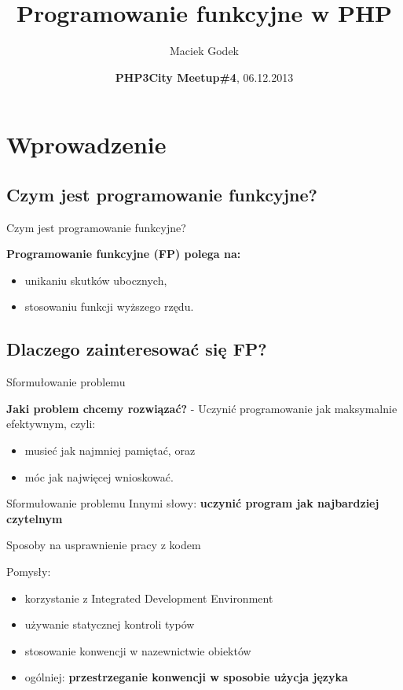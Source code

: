 \documentclass{beamer}
\title{\textbf{Programowanie funkcyjne w PHP}}
\author{Maciek Godek}
\institute{\{ \textbf{fido} : \emph{labs} \}\newline \newline
\tiny{\href{mailto:godek.maciek@gmail.com}{\textbf{godek.maciek@gmail.com}}}}
\date{\textbf{PHP3City Meetup\#4}, 06.12.2013}
\begin{document}
\begin{frame}
  \titlepage
\end{frame}

\section{Wprowadzenie}

\subsection{Czym jest programowanie funkcyjne?}

\begin{frame}{Czym jest programowanie funkcyjne?}

  \textbf{Programowanie funkcyjne (FP) polega na:}
  \pause
  \begin{itemize}
  \item
    unikaniu skutków ubocznych,
    \pause
  \item
    stosowaniu funkcji wyższego rzędu.
  \end{itemize}
\end{frame}

\subsection{Dlaczego zainteresować się FP?}

\begin{frame}{Sformułowanie problemu}

  \textbf{Jaki problem chcemy rozwiązać?}\pause \newline
  - Uczynić programowanie jak maksymalnie efektywnym, \pause czyli:
  \begin{itemize}
    \item
      musieć jak najmniej pamiętać, \pause oraz
    \item
      móc jak najwięcej wnioskować.
  \end{itemize}
\end{frame}

\begin{frame}{Sformułowanie problemu}
  Innymi słowy: \pause \textbf{uczynić program jak najbardziej czytelnym}
\end{frame}

\begin{frame}{Sposoby na usprawnienie pracy z kodem}
  
  Pomysły:\pause
  \begin{itemize}
    \item
      korzystanie z Integrated Development Environment\pause
    \item
      używanie statycznej kontroli typów\pause
    \item
      stosowanie konwencji w nazewnictwie obiektów\pause
    \item
      ogólniej: \textbf{przestrzeganie konwencji w sposobie użycja języka}
  \end{itemize}
  
\end{frame}
\end{document}
